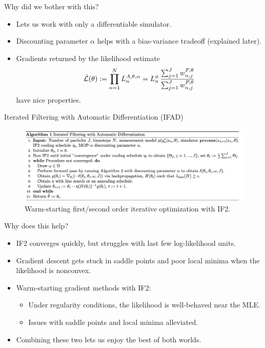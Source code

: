 \documentclass{beamer}
\begin{document}
\begin{frame}{Why did we bother with this?}
    \begin{itemize}
        \item Lets us work with only a differentiable simulator.
        \item \pause Discounting parameter $\alpha$ helps with a bias-variance tradeoff (explained later). 
        \item \pause Gradients returned by the likelihood estimate $$\hat{\mathcal{L}}(\theta) := \prod_{n=1}^N L_n^{A,\theta,\alpha} = L_n^\phi \, \frac{\sum_{j=1}^J w^{F,\theta}_{n,j}}{\sum_{j=1}^J  w^{P,\theta}_{n,j}}$$ have nice properties.
    \end{itemize}
\end{frame}


\begin{frame}{Iterated Filtering with Automatic Differentiation (IFAD)}
    \begin{figure}
        \centering
        \includegraphics[scale=0.45]{imgs/ifad.png}
        \caption{Warm-starting first/second order iterative optimization with IF2.}
        \label{fig:ifad}
    \end{figure}
\end{frame}


\begin{frame}{Why does this help?}
    \begin{itemize}
        \item IF2 converges quickly, but struggles with last few log-likelihood units. 
        \item \pause Gradient descent gets stuck in saddle points and poor local minima when the likelihood is nonconvex. 
        \item \pause Warm-starting gradient methods with IF2:
        \begin{itemize}
            \item \pause Under regularity conditions, the likelihood is well-behaved near the MLE.
            \item \pause Issues with saddle points and local minima alleviated. 
        \end{itemize}
        \item \pause Combining these two lets us enjoy the best of both worlds.
    \end{itemize}
\end{frame}
\end{document}
